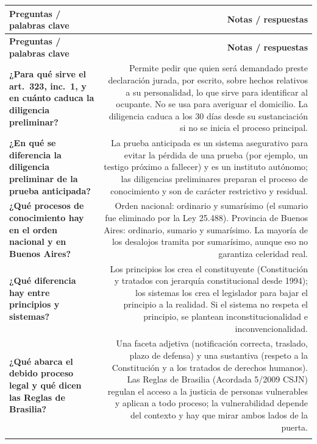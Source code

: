 \begin{longtable}{Q R}
\toprule
\textbf{Preguntas / palabras clave} & \textbf{Notas / respuestas} \\
\midrule
\endfirsthead
\toprule
\textbf{Preguntas / palabras clave} & \textbf{Notas / respuestas} \\
\midrule
\endhead

\textbf{¿Para qué sirve el art.\ 323, inc.\ 1, y en cuánto caduca la diligencia preliminar?} &
Permite pedir que quien será demandado preste declaración jurada, por escrito, sobre hechos relativos a su personalidad, lo que sirve para identificar al ocupante. No se usa para averiguar el domicilio. La diligencia caduca a los 30 días desde su sustanciación si no se inicia el proceso principal. \\
\addlinespace[0.6em]

\textbf{¿En qué se diferencia la diligencia preliminar de la prueba anticipada?} &
La prueba anticipada es un sistema asegurativo para evitar la pérdida de una prueba (por ejemplo, un testigo próximo a fallecer) y es un instituto autónomo; las diligencias preliminares preparan el proceso de conocimiento y son de carácter restrictivo y residual. \\
\addlinespace[0.6em]

\textbf{¿Qué procesos de conocimiento hay en el orden nacional y en Buenos Aires?} &
Orden nacional: ordinario y sumarísimo (el sumario fue eliminado por la Ley 25.488). Provincia de Buenos Aires: ordinario, sumario y sumarísimo. La mayoría de los desalojos tramita por sumarísimo, aunque eso no garantiza celeridad real. \\
\addlinespace[0.6em]

\textbf{¿Qué diferencia hay entre principios y sistemas?} &
Los principios los crea el constituyente (Constitución y tratados con jerarquía constitucional desde 1994); los sistemas los crea el legislador para bajar el principio a la realidad. Si el sistema no respeta el principio, se plantean inconstitucionalidad e inconvencionalidad. \\
\addlinespace[0.6em]

\textbf{¿Qué abarca el debido proceso legal y qué dicen las Reglas de Brasilia?} &
Una faceta adjetiva (notificación correcta, traslado, plazo de defensa) y una sustantiva (respeto a la Constitución y a los tratados de derechos humanos). Las Reglas de Brasilia (Acordada 5/2009 CSJN) regulan el acceso a la justicia de personas vulnerables y aplican a todo proceso; la vulnerabilidad depende del contexto y hay que mirar ambos lados de la puerta. \\
\addlinespace[0.6em]


\end{longtable}
